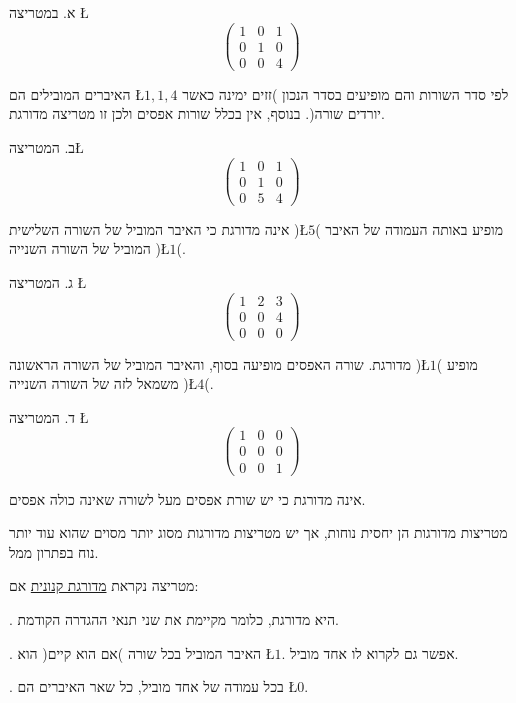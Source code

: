 \begin{examples}
א. במטריצה \L{%
\[
\begin{pmatrix}1 & 0 & 1\\
0 & 1 & 0\\
0 & 0 & 4
\end{pmatrix}
\]
}%

האיברים המובילים הם \L{$1,1,4$} לפי סדר השורות והם מופיעים בסדר הנכון
)זזים ימינה כאשר יורדים שורה(. בנוסף, אין בכלל שורות אפסים ולכן זו
מטריצה מדורגת.

ב. המטריצה\L{%
\[
\begin{pmatrix}1 & 0 & 1\\
0 & 1 & 0\\
0 & 5 & 4
\end{pmatrix}
\]
}%

אינה מדורגת כי האיבר המוביל של השורה השלישית )\L{$5$}( מופיע באותה
העמודה של האיבר המוביל של השורה השנייה )\L{$1$}(. 

ג. המטריצה \L{%
\[
\begin{pmatrix}1 & 2 & 3\\
0 & 0 & 4\\
0 & 0 & 0
\end{pmatrix}
\]
}%

מדורגת. שורה האפסים מופיעה בסוף, והאיבר המוביל של השורה הראשונה )\L{$1$}(
מופיע משמאל לזה של השורה השנייה )\L{$4$}(.

ד. המטריצה \L{%
\[
\begin{pmatrix}1 & 0 & 0\\
0 & 0 & 0\\
0 & 0 & 1
\end{pmatrix}
\]
}%

אינה מדורגת כי יש שורת אפסים מעל לשורה שאינה כולה אפסים.
\end{examples}

מטריצות מדורגות הן יחסית נוחות, אך יש מטריצות מדורגות מסוג יותר מסוים
שהוא עוד יותר נוח בפתרון ממ\textquotedbl ל.

\begin{hdef}
מטריצה נקראת \uline{מדורגת קנונית} אם:

{\endL}. היא מדורגת, כלומר מקיימת את שני תנאי ההגדרה הקודמת.

{\endL}. האיבר המוביל בכל שורה )אם הוא קיים( הוא \L{$1$}.
אפשר גם לקרוא לו אחד מוביל.

{\endL}. בכל עמודה של אחד מוביל, כל שאר האיברים הם \L{$0$}.
\end{hdef}

